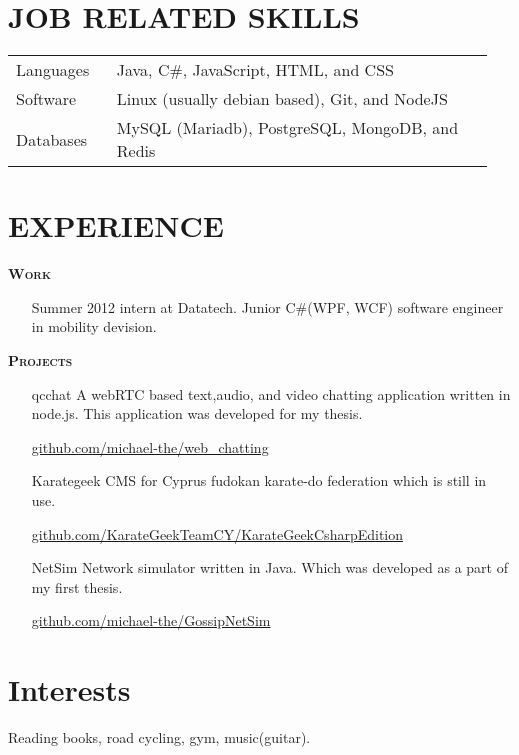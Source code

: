 \documentclass[margin, 10pt]{res} %
\begin{document}
\begin{resume}
\begin{tabular}{p{0.2\linewidth} p{0.75\linewidth}}
\end{tabular}


\section{JOB RELATED SKILLS}

\begin{tabular}{p{0.2\linewidth} p{0.75\linewidth}}

Languages & Java, C\#, JavaScript, HTML, and CSS					\\
Software & Linux (usually debian based), Git, and NodeJS 				\\
Databases & MySQL (Mariadb), PostgreSQL, MongoDB, and Redis

\end{tabular}



\section{EXPERIENCE}

\textsc{ \textbf{Work}}

\begin{itemize}
\item[Summer 2012 intern] at Datatech. Junior C\#(WPF, WCF) software engineer in mobility devision.
\end{itemize}

\textsc{ \textbf{Projects}}

\begin{itemize}

\item[qcchat] A webRTC based text,audio, and video chatting application written in node.js.
This application was developed for my thesis.

\href{https://github.com/michael-the/web_chatting}{github.com/michael-the/web\_chatting} 		\\



\item[Karategeek] CMS for Cyprus fudokan karate-do federation which is still in use.

\href{https://github.com/KarateGeekTeamCY/KarateGeekCsharpEdition/tree/baseV4.5.1}{github.com/KarateGeekTeamCY/KarateGeekCsharpEdition} \\



\item[NetSim] Network simulator written in Java.
Which was developed as a part of my first thesis.

\href{https://github.com/michael-the/GossipNetSim}{github.com/michael-the/GossipNetSim}

\end{itemize}


\section{Interests}

Reading books, road cycling, gym, music(guitar).




\end{resume}
\end{document}
